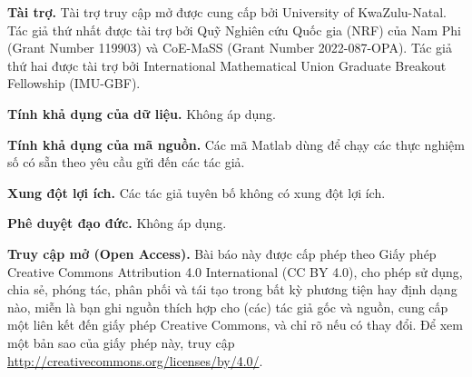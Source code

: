 \documentclass{MyBook}
\theoremstyle{plain}
\theoremstyle{definition}
\theoremstyle{remark}
\numberwithin{equation}{chapter}
\begin{document}
\medskip
\noindent\textbf{Tài trợ.} Tài trợ truy cập mở được cung cấp bởi University of KwaZulu-Natal. Tác giả thứ nhất được tài trợ bởi Quỹ Nghiên cứu Quốc gia (NRF) của Nam Phi (Grant Number 119903) và CoE-MaSS (Grant Number 2022-087-OPA). Tác giả thứ hai được tài trợ bởi International Mathematical Union Graduate Breakout Fellowship (IMU-GBF).

\medskip
\noindent\textbf{Tính khả dụng của dữ liệu.} Không áp dụng.

\medskip
\noindent\textbf{Tính khả dụng của mã nguồn.} Các mã Matlab dùng để chạy các thực nghiệm số có sẵn theo yêu cầu gửi đến các tác giả.

\medskip
\noindent\textbf{Xung đột lợi ích.} Các tác giả tuyên bố không có xung đột lợi ích.

\medskip
\noindent\textbf{Phê duyệt đạo đức.} Không áp dụng.

\medskip
\noindent\textbf{Truy cập mở (Open Access).} Bài báo này được cấp phép theo Giấy phép Creative Commons Attribution 4.0 International (CC BY 4.0), cho phép sử dụng, chia sẻ, phóng tác, phân phối và tái tạo trong bất kỳ phương tiện hay định dạng nào, miễn là bạn ghi nguồn thích hợp cho (các) tác giả gốc và nguồn, cung cấp một liên kết đến giấy phép Creative Commons, và chỉ rõ nếu có thay đổi. Để xem một bản sao của giấy phép này, truy cập \url{http://creativecommons.org/licenses/by/4.0/}.
\end{document}
